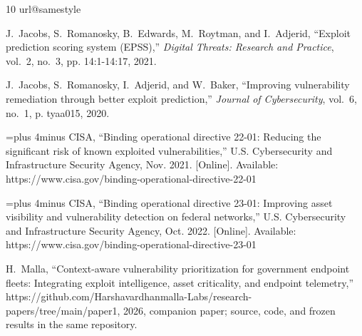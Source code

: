 \documentclass[journal]{IEEEtran}
\begin{document}
\begin{thebibliography}{10}
\providecommand{\url}[1]{#1}
\csname url@samestyle\endcsname
\providecommand{\newblock}{\relax}
\providecommand{\bibinfo}[2]{#2}
\providecommand{\BIBentrySTDinterwordspacing}{\spaceskip=0pt\relax}
\providecommand{\BIBentryALTinterwordstretchfactor}{4}
\providecommand{\BIBentryALTinterwordspacing}{\spaceskip=\fontdimen2\font plus
\BIBentryALTinterwordstretchfactor\fontdimen3\font minus
  \fontdimen4\font\relax}
\providecommand{\BIBforeignlanguage}[2]{{%
\expandafter\ifx\csname l@#1\endcsname\relax
\typeout{** WARNING: IEEEtran.bst: No hyphenation pattern has been}%
\typeout{** loaded for the language `#1'. Using the pattern for}%
\typeout{** the default language instead.}%
\else
\language=\csname l@#1\endcsname
\fi
#2}}
\providecommand{\BIBdecl}{\relax}
\BIBdecl

J.~Jacobs, S.~Romanosky, B.~Edwards, M.~Roytman, and I.~Adjerid, ``Exploit
  prediction scoring system ({EPSS}),'' \emph{Digital Threats: Research and
  Practice}, vol.~2, no.~3, pp. 14:1-14:17, 2021.

J.~Jacobs, S.~Romanosky, I.~Adjerid, and W.~Baker, ``Improving vulnerability
  remediation through better exploit prediction,'' \emph{Journal of
  Cybersecurity}, vol.~6, no.~1, p. tyaa015, 2020.

\BIBentryALTinterwordspacing
{CISA}, ``Binding operational directive 22-01: Reducing the significant risk of
  known exploited vulnerabilities,'' U.S. Cybersecurity and Infrastructure
  Security Agency, Nov. 2021. [Online]. Available:
  \url{https://www.cisa.gov/binding-operational-directive-22-01}
\BIBentrySTDinterwordspacing

\BIBentryALTinterwordspacing
{CISA}, ``Binding operational directive 23-01: Improving asset visibility and
  vulnerability detection on federal networks,'' U.S. Cybersecurity and
  Infrastructure Security Agency, Oct. 2022. [Online]. Available:
  \url{https://www.cisa.gov/binding-operational-directive-23-01}
\BIBentrySTDinterwordspacing

H.~Malla, ``Context-aware vulnerability prioritization for government endpoint
  fleets: Integrating exploit intelligence, asset criticality, and endpoint
  telemetry,''
  \url{https://github.com/Harshavardhanmalla-Labs/research-papers/tree/main/paper1},
  2026, companion paper; source, code, and frozen results in the same
  repository.


\end{thebibliography}
\end{document}
